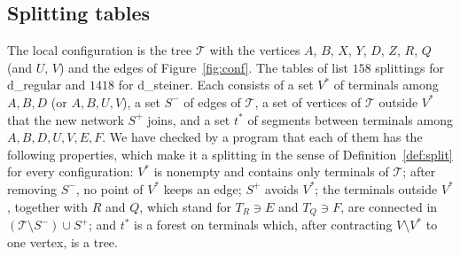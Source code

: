 \documentclass[11pt]{amsart}
\theoremstyle{definition}
\theoremstyle{remark}
\numberwithin{equation}{section}
\begin{document}
\subsection{Splitting tables}\label{sec:tables}
The local configuration is the tree $\mathcal T$ with the vertices $A$, $B$, $X$, $Y$, $D$, $Z$, $R$, $Q$ (and $U$, $V$) and the edges of Figure~\ref{fig:conf}. The tables of \cite{KHSHGW} list $158$ splittings for d\_regular and $1418$ for d\_steiner. Each consists of a set $V^*$ of terminals among $A,B,D$ (or $A,B,U,V$), a set $S^-$ of edges of $\mathcal T$, a set of vertices of $\mathcal T$ outside $V^*$ that the new network $S^+$ joins, and a set $t^*$ of segments between terminals among $A,B,D,U,V,E,F$. We have checked by a program that each of them has the following properties, which make it a splitting in the sense of Definition~\ref{def:split} for every configuration: $V^*$ is nonempty and contains only terminals of $\mathcal T$; after removing $S^-$, no point of $V^*$ keeps an edge; $S^+$ avoids $V^*$; the terminals outside $V^*$, together with $R$ and $Q$, which stand for $T_R\ni E$ and $T_Q\ni F$, are connected in $(\mathcal T\setminus S^-)\cup S^+$; and $t^*$ is a forest on terminals which, after contracting $V\setminus V^*$ to one vertex, is a tree.
\end{document}
